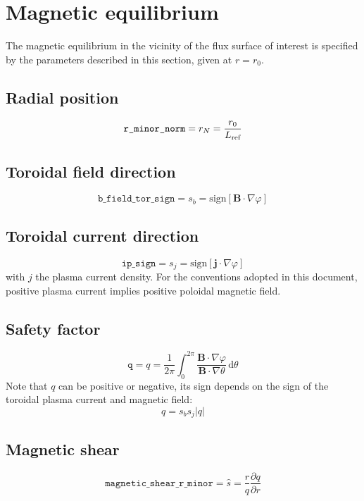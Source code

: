 \documentclass[a4paper]{report}
\begin{document}
\section{Magnetic equilibrium}
The magnetic equilibrium in the vicinity of the flux surface of interest is specified by the parameters described in this section, given at $r=r_0$.

\subsection{Radial position} \label{sec:rminor}
$$\texttt{r\_minor\_norm}=r_N=\frac{r_0}{L_{\textrm{ref}}}$$


\subsection{Toroidal field direction} \label{sec:btsign}
$$\texttt{b\_field\_tor\_sign}=s_b = \textrm{sign}[\mathbf{B}\cdot\nabla\varphi]$$

\subsection{Toroidal current direction} \label{sec:ipsign}
$$\texttt{ip\_sign}=s_j = \textrm{sign}[\mathbf{j}\cdot\nabla\varphi]$$
with $j$ the plasma current density. For the conventions adopted in this document, positive plasma current implies positive poloidal magnetic field.

\subsection{Safety factor} \label{sec:q}
$$\texttt{q}=q=\frac{1}{2\pi}\int_0^{2\pi} \frac{\mathbf{B}\cdot\nabla \varphi}{\mathbf{B}\cdot\nabla \theta}\,\textrm{d}\theta$$
Note that $q$ can be positive or negative, its sign depends on the sign of the toroidal plasma current and magnetic field:
$$q = s_b s_j |q|$$

\subsection{Magnetic shear} \label{sec:shat}
$$\texttt{magnetic\_shear\_r\_minor}=\hat{s}=\frac{r}{q}\frac{\partial q}{\partial r}$$
\end{document}
